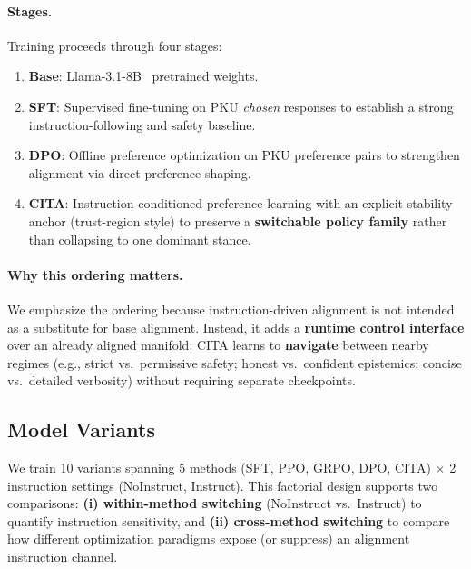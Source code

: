 \vspace{-0.2em}
\paragraph{\textbf{Stages.}}
Training proceeds through four stages:

\begin{enumerate}[leftmargin=*,itemsep=1pt]
    \item \textbf{Base}: Llama-3.1-8B~\cite{dubey2024llama} pretrained weights.
    \item \textbf{SFT}: Supervised fine-tuning on PKU \emph{chosen} responses to establish a strong instruction-following and safety baseline.
    \item \textbf{DPO}: Offline preference optimization on PKU preference pairs to strengthen alignment via direct preference shaping.
    \item \textbf{\textsc{CITA}}: Instruction-conditioned preference learning with an explicit stability anchor (trust-region style) to preserve a \textbf{switchable policy family} rather than collapsing to one dominant stance.
\end{enumerate}

\vspace{-0.2em}
\paragraph{\textbf{Why this ordering matters.}}
We emphasize the ordering because instruction-driven alignment is not intended as a substitute for base alignment.
Instead, it adds a \textbf{runtime control interface} over an already aligned manifold:
\textsc{CITA} learns to \textbf{navigate} between nearby regimes (e.g., strict vs.\ permissive safety; honest vs.\ confident epistemics; concise vs.\ detailed verbosity) without requiring separate checkpoints.

\vspace{-1mm}
\subsection{Model Variants}
\label{sec:model_variants}

We train 10 variants spanning 5 methods (SFT, PPO, GRPO, DPO, \textsc{CITA}) $\times$ 2 instruction settings (NoInstruct, Instruct).
This factorial design supports two comparisons:
\textbf{(i) within-method switching} (NoInstruct vs.\ Instruct) to quantify instruction sensitivity, and
\textbf{(ii) cross-method switching} to compare how different optimization paradigms expose (or suppress) an alignment instruction channel.


